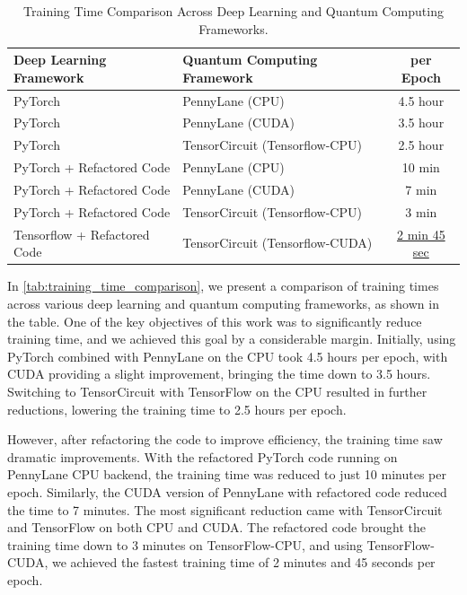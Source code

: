 \begin{table}[h]
  \caption{Training Time Comparison Across Deep Learning and Quantum
  Computing Frameworks.}
  \centering
  \begin{tabular}{|l|l|c|}
    \hline
    \textbf{Deep Learning Framework} & \textbf{Quantum Computing
    Framework}                       & \textbf{per Epoch}             \\ \hline
    PyTorch                          & PennyLane (CPU)
    & 4.5 hour                       \\ \hline
    PyTorch                          & PennyLane (CUDA)
    & 3.5 hour                       \\ \hline
    PyTorch                          & TensorCircuit (Tensorflow-CPU)
    & 2.5 hour                       \\ \hline
    PyTorch + Refactored Code        & PennyLane (CPU)
    & 10 min                         \\ \hline
    PyTorch + Refactored Code        & PennyLane (CUDA)
    & 7 min                          \\ \hline
    PyTorch + Refactored Code        & TensorCircuit (Tensorflow-CPU)
    & 3 min                          \\ \hline
    Tensorflow + Refactored Code     & TensorCircuit
    (Tensorflow-CUDA)                & \underline{2 min 45 sec}       \\ \hline
  \end{tabular}
  \label{tab:training_time_comparison}
\end{table}

In \autoref{tab:training_time_comparison}, we present a comparison of
training times across various deep learning and quantum computing
frameworks, as shown in the table. One of the key objectives of this
work was to significantly reduce training time, and we achieved this
goal by a considerable margin. Initially, using PyTorch combined with
PennyLane on the CPU took 4.5 hours per epoch, with CUDA providing a
slight improvement, bringing the time down to 3.5 hours. Switching to
TensorCircuit with TensorFlow on the CPU resulted in further
reductions, lowering the training time to 2.5 hours per epoch.

However, after refactoring the code to improve efficiency, the
training time saw dramatic improvements. With the refactored PyTorch
code running on PennyLane CPU backend, the training time was
reduced to just 10 minutes per epoch. Similarly, the CUDA version of
PennyLane with refactored code reduced the time to 7 minutes. The
most significant reduction came with TensorCircuit and TensorFlow on
both CPU and CUDA. The refactored code brought the training time down
to 3 minutes on TensorFlow-CPU, and using TensorFlow-CUDA, we
achieved the fastest training time of 2 minutes and 45 seconds per epoch.

